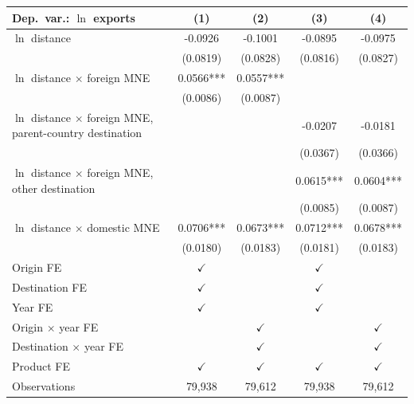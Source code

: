 \begin{tabular}{lcccc} \hline
Dep.\ var.: $\ln$ exports & (1) & (2) & (3) & (4) \\ \hline
$\ln$ distance & -0.0926 & -0.1001 & -0.0895 & -0.0975 \\
 & (0.0819) & (0.0828) & (0.0816) & (0.0827) \\
$\ln$ distance $\times$ foreign MNE & 0.0566*** & 0.0557*** &  &  \\
 & (0.0086) & (0.0087) &  &  \\
$\ln$ distance $\times$ foreign MNE, parent-country destination &  &  & -0.0207 & -0.0181 \\
 &  &  & (0.0367) & (0.0366) \\
$\ln$ distance $\times$ foreign MNE, other destination &  &  & 0.0615*** & 0.0604*** \\
 &  &  & (0.0085) & (0.0087) \\
$\ln$ distance $\times$ domestic MNE & 0.0706*** & 0.0673*** & 0.0712*** & 0.0678*** \\
 & (0.0180) & (0.0183) & (0.0181) & (0.0183) \\
\hline
Origin FE & $\checkmark$ &  & $\checkmark$ &  \\
Destination FE & $\checkmark$ &  & $\checkmark$ &  \\
Year FE & $\checkmark$ &  & $\checkmark$ &  \\
Origin $\times$ year FE &  & $\checkmark$ &  & $\checkmark$ \\
Destination $\times$ year FE &  & $\checkmark$ &  & $\checkmark$ \\
Product FE & $\checkmark$ & $\checkmark$ & $\checkmark$ & $\checkmark$ \\
\hline
Observations & 79,938 & 79,612 & 79,938 & 79,612 \\
\hline
\end{tabular}
